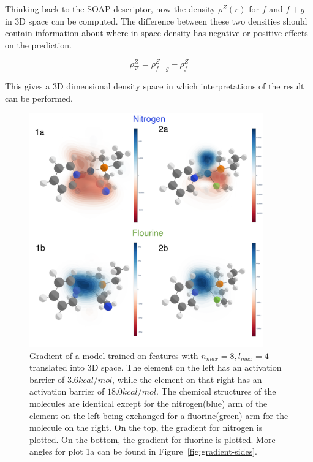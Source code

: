 Thinking back to the SOAP descriptor, now the density $\rho^Z(r)$ for $f$ and $f + g$ in 3D space can be computed.
The difference between these two densities should contain information about where in space density has negative or positive effects on the prediction.

$$ \rho^Z_\nabla = \rho^Z_{f+g} -  \rho^Z_{f} $$

This gives a 3D dimensional density space in which interpretations of the result can be performed.
\begin{figure}
  \centering
  \includegraphics[width=0.9\textwidth]{figures/evaluation/GradientComp.png}
  \caption[Comparison of local gradients]{
      Gradient of a model trained on features with $n_{max}=8, l_{max}=4$ translated into 3D space.
      The element on the left has an activation barrier of $3.6 kcal/mol$, while the element on that right
      has an activation barrier of $18.0 kcal/mol$.
      The chemical structures of the molecules are identical except for the nitrogen(blue) arm of the element
      on the left being exchanged for a fluorine(green) arm for the molecule on the right.
      On the top, the gradient for nitrogen is plotted. On the bottom, the gradient for fluorine is plotted.
      More angles for plot 1a can be found in Figure~\ref{fig:gradient-sides}.
   }
  \label{fig:snap-gradient}
\end{figure}

